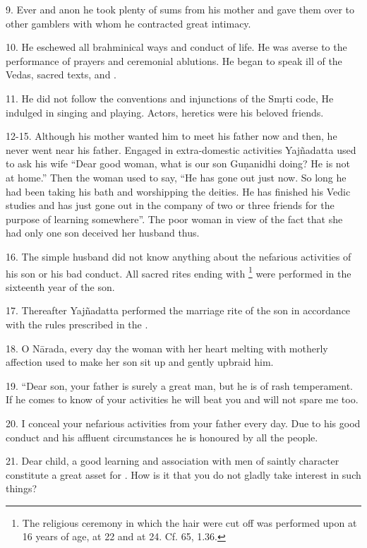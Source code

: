 9. Ever and anon he took plenty of sums from his mother and gave them over to
other gamblers with whom he contracted great intimacy.

10. He eschewed all brahminical ways and conduct of life. He was averse to
the performance of  prayers and ceremonial ablutions. He began to
speak ill of the Vedas, sacred texts,  and .

11. He did not follow the conventions and injunctions of the Smṛti code, He
indulged in singing and playing. Actors, heretics \etc were his beloved friends.

12-15. Although his mother wanted him to meet his father now and then, he never
went near his father. Engaged in extra-domestic activities Yajñadatta used to
ask his wife “Dear good woman, what is our son Guṇanidhi doing? He is not at
home.” Then the woman used to say, “He has gone out just now. So long he had
been taking his bath and worshipping the deities. He has finished his Vedic
studies and has just gone out in the company of two or three friends for
the purpose of learning somewhere”. The poor woman in view of the fact that she
had only one son deceived her husband thus.

16. The simple husband did not know anything about the nefarious activities of
his son or his bad conduct. All sacred rites ending with \footnote{
The religious ceremony  in which the hair were cut off was performed
upon  at 16 years of age,  at 22 and 
at 24. Cf.  65,  1.36.} were performed in
the sixteenth year of the son.

17. Thereafter Yajñadatta performed the marriage rite of the son in accordance
with the rules prescribed in the .

18. O Nārada, every day the woman with her heart melting with motherly affection
used to make her son sit up and gently upbraid him.

19. “Dear son, your father is surely a great man, but he is of rash temperament.
If he comes to know of your activities he will beat you and will not spare me
too.

20. I conceal your nefarious activities from your father every day. Due to his
good conduct and his affluent circumstances he is honoured by all the people.

21. Dear child, a good learning and association with men of saintly character
constitute a great asset for . How is it that you do not gladly
take interest in such things?

